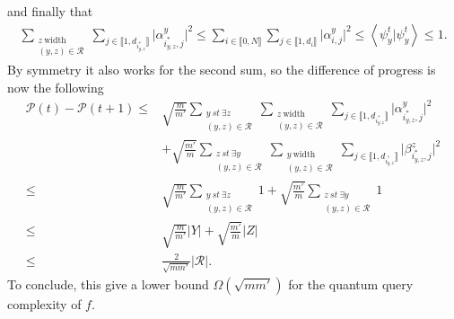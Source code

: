 \begin{appendix}
\begin{tproof}
        and finally that
        \begin{align*}
            \sum_{\substack{z\ \textrm{width} \\ (y,z) \in \mathcal{R}}}
            \sum_{j\in\llbracket1,d_{i^*_{y,z}}\rrbracket}\vert\alpha^{y}_{i^*_{y,z},j}\vert^2
            \leq \sum_{i \in \llbracket0,N\rrbracket}
            \sum_{j\in\llbracket1,d_{i}\rrbracket}\vert\alpha^{y}_{i,j}\vert^2 \leq \left\langle \psi_y^t \vert \psi_y^t \right\rangle \leq 1.
        \end{align*}
        By symmetry it also works for the second sum, so the difference of progress is now the following
        \begin{align*}
            \mathcal{P}(t)- \mathcal{P}(t+1)  \leq & \sqrt{\frac{m}{m'}}
            \sum_{\substack{y\ st\ \exists z                                                                               \\ (y,z) \in \mathcal{R}}}
            \sum_{\substack{z\ \textrm{width}                                                                              \\ (y,z) \in \mathcal{R}}}
            \sum_{j\in\llbracket1,d_{i^*_{y,z}}\rrbracket}\vert\alpha^{y}_{i^*_{y,z},j}\vert^2                             \\
                                                   & +\sqrt{\frac{m'}{m}} \sum_{\substack{z\ st\ \exists y                 \\ (y,z) \in \mathcal{R}}}
            \sum_{\substack{y\ \textrm{width}                                                                              \\ (y,z) \in \mathcal{R}}}
            \sum_{j\in\llbracket1,d_{i^*_{y,z}}\rrbracket}\vert\beta^{z}_{i^*_{y,z},j}\vert^2                              \\
            \leq                                   & \sqrt{\frac{m}{m'}} \sum_{\substack{y\ st\ \exists z                  \\ (y,z) \in \mathcal{R}}} 1 + \sqrt{\frac{m'}{m}} \sum_{\substack{z\ st\ \exists y \\ (y,z) \in \mathcal{R}}} 1 \\
            \leq                                   & \sqrt{\frac{m}{m'}} \vert Y \vert + \sqrt{\frac{m'}{m}} \vert Z \vert \\
            \leq                                   & \frac{2}{\sqrt{mm'}}\vert \mathcal{R} \vert.
        \end{align*}
        To conclude, this give a lower bound $\Omega(\sqrt{mm'})$ for the quantum query complexity of $f$.


\end{tproof}
\end{appendix}
